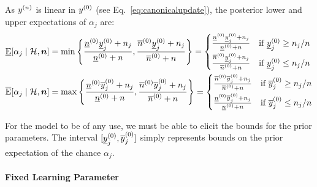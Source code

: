 As $y^{(n)}$ is linear in $y^{(0)}$ (see Eq.~\eqref{eq:canonicalupdate}), the posterior lower and upper expectations of $\alpha_j$ are:
\begin{align}
  \label{eq:idm-update-lower}
  \underline{\operatorname{E}}[\alpha_j\mid\mathcal{H},{\bm n}]
  &=
  \min\left\{
    \frac{\underline{n}^{(0)}\underline{y}^{(0)}_j + n_j}{\underline{n}^{(0)} + n},
    \frac{\overline{n}^{(0)}\underline{y}^{(0)}_j + n_j}{\overline{n}^{(0)} + n}
  \right\}
  =
  \begin{cases}
    \frac{\underline{n}^{(0)}\underline{y}^{(0)}_j + n_j}{\underline{n}^{(0)} + n} & \text{if }\underline{y}^{(0)}_j\ge n_j/n \\[1ex]
    \frac{\overline{n}^{(0)}\underline{y}^{(0)}_j + n_j}{\overline{n}^{(0)} + n} & \text{if }\underline{y}^{(0)}_j\le n_j/n
  \end{cases}
  \\
  \label{eq:idm-update-upper}
  \overline{\operatorname{E}}[\alpha_j\mid\mathcal{H},{\bm n}]
  &=
  \max\left\{
    \frac{\underline{n}^{(0)}\overline{y}^{(0)}_j + n_j}{\underline{n}^{(0)} + n},
    \frac{\overline{n}^{(0)}\overline{y}^{(0)}_j + n_j}{\overline{n}^{(0)} + n}
  \right\}
  =
  \begin{cases}
    \frac{\overline{n}^{(0)}\overline{y}^{(0)}_j + n_j}{\overline{n}^{(0)} + n} & \text{if }\overline{y}^{(0)}_j\ge n_j/n \\[1ex]
    \frac{\underline{n}^{(0)}\overline{y}^{(0)}_j + n_j}{\underline{n}^{(0)} + n} & \text{if }\overline{y}^{(0)}_j\le n_j/n
  \end{cases}
\end{align}

For the model to be of any use, we must be able to elicit the bounds for the prior parameters.
The interval $[\underline{y}^{(0)}_j,\overline{y}^{(0)}_j]$ simply represents bounds on the prior expectation of the chance $\alpha_j$.

\paragraph{Fixed Learning Parameter}

